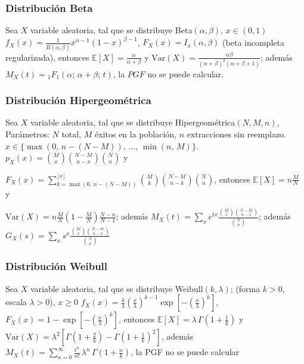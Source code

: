 \subsubsection{Distribuci\'on Beta}

\begin{Def} Sea $X$ variable aleatoria, tal que se distribuye Beta$(\alpha,\beta)$,  $x \in (0,1)$
$f_X(x) = \frac{1}{B(\alpha,\beta)} x^{\alpha-1}(1-x)^{\beta-1}$, $F_X(x) = I_{x}(\alpha,\beta)$ (beta incompleta regularizada), entonces $\mathbb{E}[X] = \frac{\alpha}{\alpha+\beta}$ y $\mathrm{Var}(X) = \frac{\alpha\beta}{(\alpha+\beta)^{2}(\alpha+\beta+1)}$; adem\'as $M_X(t) = {}_{1}F_{1}(\alpha;\,\alpha+\beta;\,t)$,  la $PGF$ no se puede calcular.
\end{Def}

\subsubsection{Distribuci\'on Hipergeom\'etrica}

\begin{Def} Sea $X$ variable aleatoria, tal que se distribuye Hipergeom\'etrica$(N,M,n)$,  Par\'ametros: $N$ total,  $M$ \'exitos en la poblaci\'on, $n$ extracciones sin reemplazo.   $x \in \{\max(0,\,n-(N-M)),\,\dots,\,\min(n,\,M)\}$.  $p_X(x) = \binom{M}{x}\binom{N-M}{n-x}\binom{N}{n}$ y 

$F_X(x) = \sum_{k=\max(0,\,n-(N-M))}^{\lfloor x \rfloor}\binom{M}{k}\binom{N-M}{n-k}\binom{N}{n}$, entonces  $\mathbb{E}[X] = n\frac{M}{N}$ y 

$\mathrm{Var}(X) = n\frac{M}{N}\!\left(1-\frac{M}{N}\right)\!\frac{N-n}{N-1}$; adem\'as $M_X(t) = \sum_{x} e^{tx}\frac{\binom{M}{x}\binom{N-M}{n-x}}{\binom{N}{n}}$; adem\'as $G_X(s) = \sum_{x} s^{x}
\frac{\binom{M}{x}\binom{N-m}{n-x}}{\binom{N}{n}}$

\end{Def}

\subsubsection{Distribuci\'on Weibull}

\begin{Def} Sea $X$ variable aleatoria, tal que se distribuye  Weibull$(k,\lambda)$; (forma $k>0$, escala $\lambda>0$), $x\geq0$
$f_X(x) = \frac{k}{\lambda}\left(\frac{x}{\lambda}\right)^{k-1}\exp\!\left[-\left(\frac{x}{\lambda}\right)^{k}\right]$,  $F_X(x) = 1-\exp\!\left[-\left(\frac{x}{\lambda}\right)^{k}\right]$, entonces $\mathbb{E}[X] = \lambda\,\Gamma\!\left(1+\frac{1}{k}\right)$ y $\mathrm{Var}(X) = \lambda^{2}\!\left[\Gamma\!\left(1+\frac{2}{k}\right)-\Gamma\!\left(1+\frac{1}{k}\right)^{2}\right]$, adem\'as
$M_X(t) = \sum_{n=0}^{\infty} \frac{t^{n}}{n!}\,\lambda^{n}\,\Gamma\!\left(1+\frac{n}{k}\right)$,  la PGF no se puede calcular
\end{Def}

